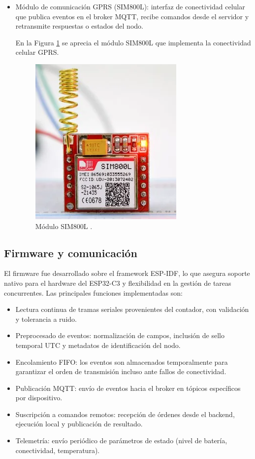 \begin{itemize}

    
    \item Módulo de comunicación GPRS (SIM800L): interfaz de conectividad celular que publica eventos en el broker MQTT, recibe comandos desde el servidor y retransmite respuestas o estados del nodo.
    
En la Figura \ref{fig:foto_sim800l} se aprecia el módulo SIM800L que implementa la conectividad celular GPRS.

\begin{figure}[htbp]
  \centering
  \includegraphics[width=0.4\linewidth]{./Figures/fotoSim800l.png}
  \caption{Módulo SIM800L \protect\footnotemark.}
  \label{fig:foto_sim800l}
\end{figure}



\end{itemize}

\subsection{Firmware y comunicación}
El firmware fue desarrollado sobre el framework ESP-IDF, lo que asegura soporte nativo para el hardware del ESP32-C3 y flexibilidad en la gestión de tareas concurrentes. Las principales funciones implementadas son:

\begin{itemize}
    \item Lectura continua de tramas seriales provenientes del contador, con validación y tolerancia a ruido.
    \item Preprocesado de eventos: normalización de campos, inclusión de sello temporal UTC y metadatos de identificación del nodo.
    \item Encolamiento FIFO: los eventos son almacenados temporalmente para garantizar el orden de transmisión incluso ante fallos de conectividad.
    \item Publicación MQTT: envío de eventos hacia el broker en tópicos específicos por dispositivo.
    \item Suscripción a comandos remotos: recepción de órdenes desde el backend, ejecución local y publicación de resultado.
    \item Telemetría: envío periódico de parámetros de estado (nivel de batería, conectividad, temperatura).
\end{itemize}



